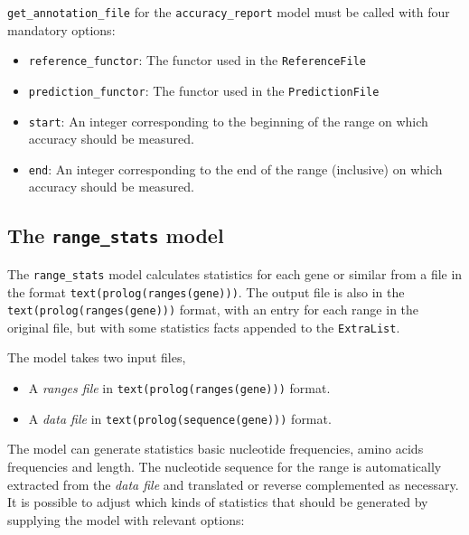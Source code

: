 \documentclass{book}
\begin{document}
\texttt{get\_annotation\_file} for the \texttt{accuracy\_report} model
must be called with four mandatory options:
\begin{itemize}
\item \texttt{reference\_functor}: The functor used in the \texttt{ReferenceFile}
\item \texttt{prediction\_functor}: The functor used in the
  \texttt{PredictionFile}
\item \texttt{start}: An integer corresponding to the beginning of the range on which accuracy
  should be measured.
\item \texttt{end}: An integer corresponding to the end of the range
  (inclusive) on which accuracy should be measured.
\end{itemize}

\subsection{The \texttt{range\_stats} model}

The \texttt{range\_stats} model calculates statistics for each gene or similar from a 
file in the format \texttt{text(prolog(ranges(gene)))}. The output file is also in the \texttt{text(prolog(ranges(gene)))} format, 
with an entry for each range in the original file, but with some statistics facts appended to the \texttt{ExtraList}.

The model takes two input files, 
\begin{itemize}
\item A \emph{ranges file} in \texttt{text(prolog(ranges(gene)))} format. 
\item A \emph{data file} in \texttt{text(prolog(sequence(gene)))} format.
\end{itemize}

The model can generate statistics basic nucleotide frequencies, amino acids frequencies and length.
The nucleotide sequence for the range is automatically extracted from the \emph{data file} and translated or 
reverse complemented as necessary. It is possible to adjust which kinds of statistics that should be generated by supplying the model
with relevant options:
\end{document}
